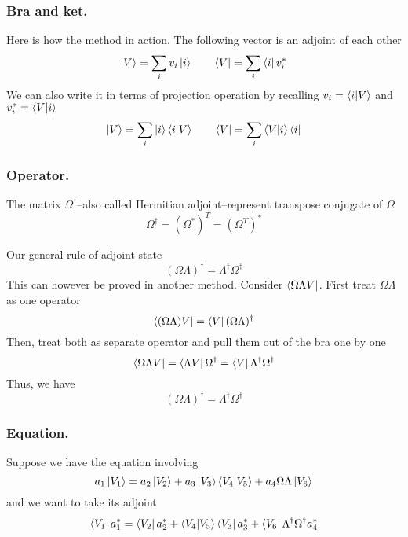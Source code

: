\documentclass[../main.tex]{subfiles}
\begin{document}
\subsubsection*{Bra and ket.}
Here is how the method in action.
The following vector is an adjoint of each other
\begin{equation*}
	\ket{V}=\sum_iv_i \ket{i}\qquad \bra{V}=\sum_i \bra{i}v_i^*
\end{equation*}
We can also write it in terms of projection operation by recalling $v_i=\braket{i|V}$ and $v_i^*=\braket{V|i}$
\begin{equation*}
	\ket{V}=\sum_i \ket{i} \braket{i|V}\qquad \bra{V}=\sum_i \braket{V|i}\bra{i}
\end{equation*}

\subsubsection*{Operator.}
The matrix $\Omega^\dagger$--also called Hermitian adjoint--represent transpose conjugate of $\Omega$
\begin{equation*}
	\Omega^{\dagger}=(\Omega^*)^T=(\Omega^T)^*
\end{equation*}

Our general rule of adjoint state
\begin{equation*}
	(\Omega\Lambda)^\dagger=\Lambda ^\dagger \Omega ^\dagger
\end{equation*}
This can however be proved in another method.
Consider $\bra{\Omega \Lambda V}$. First treat $\Omega\Lambda$ as one operator
\begin{equation*}
	\bra{(\Omega\Lambda)V}=\bra{V}(\Omega\Lambda) ^\dagger
\end{equation*}
Then, treat both as separate operator and pull them out of the bra one by one
\begin{equation*}
	\bra{\Omega\Lambda V}=\bra{\Lambda V}\Omega^\dagger=\bra{V}\Lambda ^\dagger \Omega ^\dagger
\end{equation*}
Thus, we have
\begin{equation*}
	(\Omega\Lambda) ^\dagger=\Lambda ^\dagger\Omega ^\dagger
\end{equation*}

\subsubsection*{Equation.}
Suppose we have the equation involving
\begin{equation*}
	a_1 \ket{V_1}=a_2 \ket{V_2}+a_3 \ket{V_3}\braket{V_4|V_5}+a_4\Omega\Lambda \ket{V_6}
\end{equation*}
and we want to take its adjoint
\begin{equation*}
	\bra{V_1}a_1 ^*=\bra{V_2}a_2 ^*+\braket{V_4|V_5}\bra{V_3}a_3 ^*+\bra{V_6}\Lambda ^\dagger\Omega ^\dagger a_4 ^*
\end{equation*}
\end{document}
